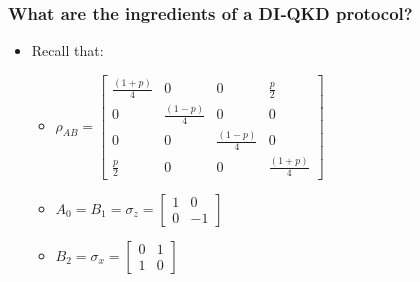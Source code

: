 \documentclass{beamer}
\begin{document}
		\begin{frame}
			\frametitle{\large What are the ingredients of a DI‑QKD protocol?}

            \vspace{2.5ex}
            \begin{itemize}
                \item Recall that:
                \vspace{2ex}
                \begin{itemize}
                    \item ${\rho}_{AB} = \begin{bmatrix}
                        \frac{(1 + p)}{4} & 0 & 0 & \frac{p}{2}\\
                        0 & \frac{(1 - p)}{4} & 0 & 0\\
                        0 & 0 & \frac{(1 - p)}{4} & 0\\
                        \frac{p}{2} & 0 & 0 & \frac{(1 + p)}{4}
                    \end{bmatrix}$
                \end{itemize}
                \hspace*{-4ex}
                \begin{minipage}{0.5\textwidth}
                    \begin{itemize}
                        \item ${A}_{0} = {B}_{1} = {\sigma}_{z} =
                        \begin{bmatrix}
                            1 &  0 \\
                            0 & -1
                        \end{bmatrix}$
                        \vspace{2ex}
                        \item ${B}_{2} = {\sigma}_{x} = \begin{bmatrix}
                            0 & 1 \\
                            1 & 0
                        \end{bmatrix}$
                    \end{itemize}
                \end{minipage}%
                \hspace*{-2.5ex}
                \begin{minipage}{0.5\textwidth}
                    \vspace{1.25ex}
                    \begin{itemize}

\end{itemize}
\end{minipage}
\end{itemize}
\end{frame}
\end{document}
